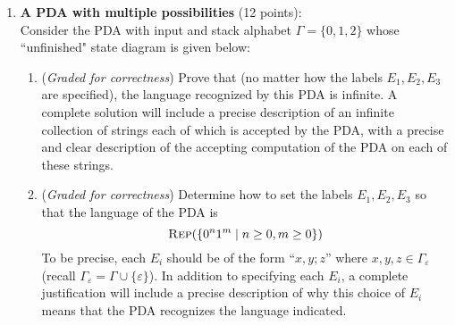 \documentclass[12pt, oneside]{article}
\newcommand{\gradeCorrect}{({\it Graded for correctness}) }
\newcommand{\gradeComplete}{({\it Graded for completeness}) }
\newcommand{\REP}{\textsc{Rep}}
\begin{document}
\begin{enumerate}
\begin{enumerate}
    \item\gradeComplete (Step 4): Describe why this statement is true/false/misleading.
\end{enumerate}

\item \textbf{A PDA with multiple possibilities} (12 points): \\
Consider the PDA with input and stack alphabet $\Gamma = \{0,1,2\}$ 
whose ``unfinished" state diagram is given below:

\begin{center}
\end{center}

\begin{enumerate}
    \item\gradeCorrect Prove that (no matter how the labels $E_1, E_2, E_3$ are specified), 
    the language recognized by this 
    PDA is infinite. A complete solution will include a precise
    description of an infinite collection of strings each 
    of which is accepted by the PDA, with 
    a precise and
    clear description of the accepting computation of the PDA on 
    each of these strings.

    \item\gradeCorrect Determine how to set the labels $E_1, E_2, E_3$ so that the language of the PDA is 
    \[
    \REP(\{0^n1^m \mid n \ge 0, m \ge 0\})
    \]
    To be precise, each $E_i$ should be of the form ``$x,y; z$'' 
    where $x, y, z \in \Gamma_{\varepsilon}$ (recall $\Gamma_{\varepsilon} = \Gamma \cup \{\varepsilon\}$).
    In addition to specifying each $E_i$, a complete justification 
    will include a precise description of why this choice of $E_i$
    means that the PDA recognizes the language indicated.


\end{enumerate}
\end{enumerate}
\end{document}
